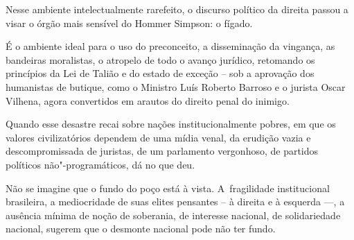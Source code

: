  

Nesse ambiente intelectualmente rarefeito, o discurso político da
direita passou a visar o órgão mais sensível do Hommer Simpson: o
fígado.

 

É o ambiente ideal para o uso do preconceito, a disseminação da
vingança, as bandeiras moralistas, o atropelo de todo o avanço jurídico,
retomando os princípios da Lei de Talião e do estado de exceção -- sob a
aprovação dos humanistas de butique, como o Ministro Luís Roberto
Barroso e o jurista Oscar Vilhena, agora convertidos em arautos do
direito penal do inimigo.

 

Quando esse desastre recai sobre nações institucionalmente pobres, em
que os valores civilizatórios dependem de uma mídia venal, da erudição
vazia e descompromissada de juristas, de um parlamento vergonhoso, de
partidos políticos não"-programáticos, dá no que deu.

 

Não se imagine que o fundo do poço está à vista. A~fragilidade
institucional brasileira, a mediocridade de suas elites pensantes -- à
direita e à esquerda \mbox{---,} a ausência mínima de noção de soberania, de
interesse nacional, de solidariedade nacional, sugerem que o desmonte
nacional pode não ter fundo.
